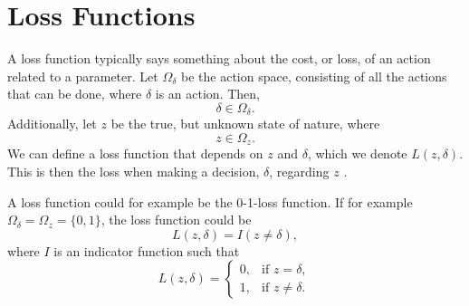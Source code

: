 \section{Loss Functions}
\label{theory_loss_functions}
A loss function typically says something about the cost, or loss, of an action related to a parameter. Let $\Omega_{\delta}$ be the action space, consisting of all the actions that can be done, where $\delta$ is an action. Then,
\begin{equation*}
    \delta \in \Omega_{\delta}.
\end{equation*}
Additionally, let $z$ be the true, but unknown state of nature, where 
\begin{equation*}
    z \in \Omega_z.
\end{equation*} 
We can define a loss function that depends on $z$ and $\delta$, which we denote $L(z,\delta)$. This is then the loss when making a decision, $\delta$, regarding $z$ \citep{statisticalDecisionTheoryLiese2008}.

A loss function could for example be the 0-1-loss function. If for example $\Omega_{\delta}= \Omega_z = \{0,1\}$, the loss function could be
\begin{equation}
\label{loss_func_indicator}
    L(z,\delta) = I(z \neq \delta),
\end{equation}
where $I$ is an indicator function such that
\begin{equation*}
    L(z,\delta) =
    \begin{cases}
        0,&  \text{if } z = \delta, \\
        1,&  \text{if } z \neq \delta.
    \end{cases}
\end{equation*}


